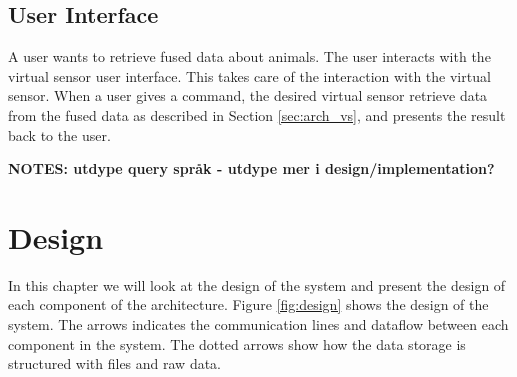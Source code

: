\documentclass[USenglish]{uit-thesis}
\begin{document}


\section{User Interface} \label{sec:arch_user_int}
A user wants to retrieve fused data about animals. The user interacts with the virtual sensor user interface. This takes care of the interaction with the virtual sensor. When a user gives a command, the desired virtual sensor retrieve data from the fused data as described in Section \ref{sec:arch_vs}, and presents the result back to the user.

\textbf{NOTES: utdype query språk - utdype mer i design/implementation?}



\chapter{Design}

In this chapter we will look at the design of the system and present the design of each component of the architecture. Figure \ref{fig:design} shows the design of the system. The arrows indicates the communication lines and dataflow between each component in the system. The dotted arrows show how the data storage is structured with files and raw data.

\end{document}
